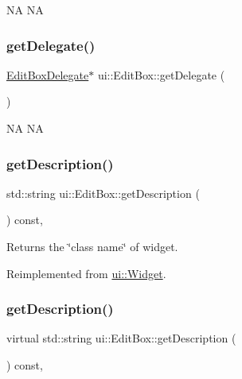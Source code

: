 NA  NA \mbox{\label{classui_1_1EditBox_a46e2b844d36d0142344be742508718a5}} 
\subsubsection{\texorpdfstring{get\+Delegate()}{getDelegate()}\hspace{0.1cm}{\footnotesize\ttfamily [2/2]}}
{\footnotesize\ttfamily \hyperlink{classui_1_1EditBoxDelegate}{Edit\+Box\+Delegate}$\ast$ ui\+::\+Edit\+Box\+::get\+Delegate (\begin{DoxyParamCaption}{ }\end{DoxyParamCaption})}

NA  NA \mbox{\label{classui_1_1EditBox_a00b9b37d30ef21b95997a016af53e05e}} 
\subsubsection{\texorpdfstring{get\+Description()}{getDescription()}\hspace{0.1cm}{\footnotesize\ttfamily [1/2]}}
{\footnotesize\ttfamily std\+::string ui\+::\+Edit\+Box\+::get\+Description (\begin{DoxyParamCaption}{ }\end{DoxyParamCaption}) const\hspace{0.3cm}{\ttfamily [override]}, {\ttfamily [virtual]}}

Returns the \char`\"{}class name\char`\"{} of widget. 

Reimplemented from \hyperlink{classui_1_1Widget_ad85abdaa9133dc6b8efc32670ae9b93f}{ui\+::\+Widget}.

\mbox{\label{classui_1_1EditBox_a7b19d7662f3a8ab64601c5c8abd8aada}} 
\subsubsection{\texorpdfstring{get\+Description()}{getDescription()}\hspace{0.1cm}{\footnotesize\ttfamily [2/2]}}
{\footnotesize\ttfamily virtual std\+::string ui\+::\+Edit\+Box\+::get\+Description (\begin{DoxyParamCaption}{ }\end{DoxyParamCaption}) const\hspace{0.3cm}{\ttfamily [override]}, {\ttfamily [virtual]}}

